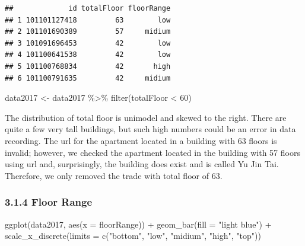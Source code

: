 \documentclass[
]{article}
\newenvironment{Shaded}{\begin{snugshade}}{\end{snugshade}}
\newcommand{\AttributeTok}[1]{\textcolor[rgb]{0.77,0.63,0.00}{#1}}
\newcommand{\DecValTok}[1]{\textcolor[rgb]{0.00,0.00,0.81}{#1}}
\newcommand{\FunctionTok}[1]{\textcolor[rgb]{0.00,0.00,0.00}{#1}}
\newcommand{\NormalTok}[1]{#1}
\newcommand{\OtherTok}[1]{\textcolor[rgb]{0.56,0.35,0.01}{#1}}
\newcommand{\SpecialCharTok}[1]{\textcolor[rgb]{0.00,0.00,0.00}{#1}}
\newcommand{\StringTok}[1]{\textcolor[rgb]{0.31,0.60,0.02}{#1}}
\begin{document}
\begin{verbatim}
##             id totalFloor floorRange
## 1 101101127418         63        low
## 2 101101690389         57     midium
## 3 101091696453         42        low
## 4 101100641538         42        low
## 5 101100768834         42       high
## 6 101100791635         42     midium
\end{verbatim}

\begin{Shaded}
\begin{Highlighting}[]
\NormalTok{data2017 }\OtherTok{\textless{}{-}}\NormalTok{ data2017 }\SpecialCharTok{\%\textgreater{}\%}
  \FunctionTok{filter}\NormalTok{(totalFloor }\SpecialCharTok{\textless{}} \DecValTok{60}\NormalTok{)}
\end{Highlighting}
\end{Shaded}

The distribution of total floor is unimodel and skewed to the right.
There are quite a few very tall buildings, but such high numbers could
be an error in data recording. The url for the apartment located in a
building with 63 floors is invalid; however, we checked the apartment
located in the building with 57 floors using url and, surprisingly, the
building does exist and is called Yu Jin Tai. Therefore, we only removed
the trade with total floor of 63.

\hypertarget{floor-range}{%
\subsubsection{3.1.4 Floor Range}\label{floor-range}}

\begin{Shaded}
\begin{Highlighting}[]
\FunctionTok{ggplot}\NormalTok{(data2017, }\FunctionTok{aes}\NormalTok{(}\AttributeTok{x =}\NormalTok{ floorRange)) }\SpecialCharTok{+} 
  \FunctionTok{geom\_bar}\NormalTok{(}\AttributeTok{fill =} \StringTok{"light blue"}\NormalTok{) }\SpecialCharTok{+}
  \FunctionTok{scale\_x\_discrete}\NormalTok{(}\AttributeTok{limits =} \FunctionTok{c}\NormalTok{(}\StringTok{"bottom"}\NormalTok{, }\StringTok{"low"}\NormalTok{, }\StringTok{"midium"}\NormalTok{, }\StringTok{"high"}\NormalTok{, }\StringTok{"top"}\NormalTok{)) }
\end{Highlighting}
\end{Shaded}
\end{document}

